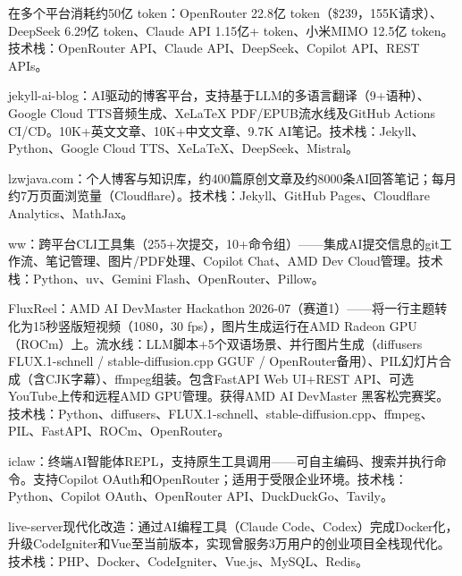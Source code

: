 \begin{cventries}
{\begin{cvitems}
        \item {在多个平台消耗约50亿 token：OpenRouter 22.8亿 token（\$239，155K请求）、DeepSeek 6.29亿 token、Claude API 1.15亿+ token、小米MIMO 12.5亿 token。技术栈：OpenRouter API、Claude API、DeepSeek、Copilot API、REST APIs。}
        \item {jekyll-ai-blog：AI驱动的博客平台，支持基于LLM的多语言翻译（9+语种）、Google Cloud TTS音频生成、XeLaTeX PDF/EPUB流水线及GitHub Actions CI/CD。10K+英文文章、10K+中文文章、9.7K AI笔记。技术栈：Jekyll、Python、Google Cloud TTS、XeLaTeX、DeepSeek、Mistral。}
        \item {lzwjava.com：个人博客与知识库，约400篇原创文章及约8000条AI回答笔记；每月约7万页面浏览量（Cloudflare）。技术栈：Jekyll、GitHub Pages、Cloudflare Analytics、MathJax。}
        \item {ww：跨平台CLI工具集（255+次提交，10+命令组）——集成AI提交信息的git工作流、笔记管理、图片/PDF处理、Copilot Chat、AMD Dev Cloud管理。技术栈：Python、uv、Gemini Flash、OpenRouter、Pillow。}
        \item {FluxReel：AMD AI DevMaster Hackathon 2026-07（赛道1）——将一行主题转化为15秒竖版短视频（1080，30 fps），图片生成运行在AMD Radeon GPU（ROCm）上。流水线：LLM脚本+5个双语场景、并行图片生成（diffusers FLUX.1-schnell / stable-diffusion.cpp GGUF / OpenRouter备用）、PIL幻灯片合成（含CJK字幕）、ffmpeg组装。包含FastAPI Web UI+REST API、可选YouTube上传和远程AMD GPU管理。获得AMD AI DevMaster 黑客松完赛奖。技术栈：Python、diffusers、FLUX.1-schnell、stable-diffusion.cpp、ffmpeg、PIL、FastAPI、ROCm、OpenRouter。}
        \item {iclaw：终端AI智能体REPL，支持原生工具调用——可自主编码、搜索并执行命令。支持Copilot OAuth和OpenRouter；适用于受限企业环境。技术栈：Python、Copilot OAuth、OpenRouter API、DuckDuckGo、Tavily。}
        \item {live-server现代化改造：通过AI编程工具（Claude Code、Codex）完成Docker化，升级CodeIgniter和Vue至当前版本，实现曾服务3万用户的创业项目全栈现代化。技术栈：PHP、Docker、CodeIgniter、Vue.js、MySQL、Redis。}
      \end{cvitems}
    }


\end{cventries}
